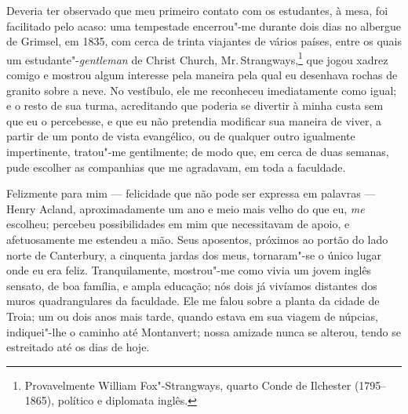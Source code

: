 Deveria ter observado que meu primeiro contato com os estudantes, à
mesa, foi facilitado pelo acaso: uma tempestade encerrou"-me durante dois
dias no albergue de Grimsel, em 1835, com cerca de trinta viajantes de
vários países, entre os quais um estudante"-\textit{gentleman} de Christ
Church, Mr.\,Strangways,\footnote{Provavelmente William Fox"-Strangways, quarto
  Conde de Ilchester (1795--1865), político e diplomata inglês.} que jogou xadrez comigo e mostrou algum interesse pela
maneira pela qual eu desenhava rochas de granito sobre a neve. No
vestíbulo, ele me reconheceu imediatamente como igual; e o resto de sua
turma, acreditando que poderia se divertir à minha custa sem que eu o
percebesse, e que eu não pretendia modificar sua maneira de viver, a
partir de um ponto de vista evangélico, ou de qualquer outro igualmente
impertinente, tratou"-me gentilmente; de modo que, em cerca de duas
semanas, pude escolher as companhias que me agradavam, em toda a
faculdade.

Felizmente para mim --- felicidade que não pode ser expressa em palavras
--- Henry Acland, aproximadamente um ano e meio mais velho do que eu,
\textit{me} escolheu; percebeu possibilidades em mim que necessitavam de
apoio, e afetuosamente me estendeu a mão. Seus aposentos, próximos ao
portão do lado norte de Canterbury, a cinquenta jardas dos meus,
tornaram"-se o único lugar onde eu era feliz. Tranquilamente, mostrou"-me
como vivia um jovem inglês sensato, de boa família, e ampla educação;
nós dois já vivíamos distantes dos muros quadrangulares da faculdade.
Ele me falou sobre a planta da cidade de Troia; um ou dois anos mais
tarde, quando estava em sua viagem de núpcias, indiquei"-lhe o caminho
até Montanvert; nossa amizade nunca se alterou, tendo se estreitado até
os dias de hoje.

